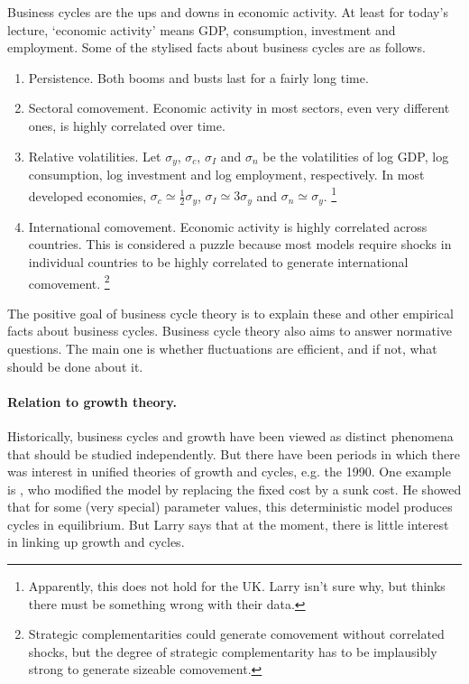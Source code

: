 \documentclass[11pt,letterpaper,reqno,oneside]{article}
\begin{document}
Business cycles are the ups and downs in economic activity. At least for today's lecture, `economic activity' means GDP, consumption, investment and employment. Some of the stylised facts about business cycles are as follows.
%
\begin{enumerate}
	
	\item Persistence. Both booms and busts last for a fairly long time.

	\item Sectoral comovement. Economic activity in most sectors, even very different ones, is highly correlated over time.

	\item Relative volatilities. Let $\sigma_y$, $\sigma_c$, $\sigma_I$ and $\sigma_n$ be the volatilities of log GDP, log consumption, log investment and log employment, respectively. In most developed economies, $\sigma_c \simeq \tfrac{1}{2} \sigma_y$, $\sigma_I \simeq 3 \sigma_y$ and $\sigma_n \simeq \sigma_y$.%
		\footnote{Apparently, this does not hold for the UK. Larry isn't sure why, but thinks there must be something wrong with their data.}

	\item International comovement. Economic activity is highly correlated across countries. This is considered a puzzle because most models require shocks in individual countries to be highly correlated to generate international comovement.%
		\footnote{Strategic complementarities could generate comovement without correlated shocks, but the degree of strategic complementarity has to be implausibly strong to generate sizeable comovement.}
	
\end{enumerate}
%
The positive goal of business cycle theory is to explain these and other empirical facts about business cycles. Business cycle theory also aims to answer normative questions. The main one is whether fluctuations are efficient, and if not, what should be done about it.


\paragraph{Relation to growth theory.} Historically, business cycles and growth have been viewed as distinct phenomena that should be studied independently. But there have been periods in which there was interest in unified theories of growth and cycles, e.g. the 1990. One example is \textcite{Matsuyama1999}, who modified the \textcite{Romer1987} model by replacing the fixed cost by a sunk cost. He showed that for some (very special) parameter values, this deterministic model produces cycles in equilibrium. But Larry says that at the moment, there is little interest in linking up growth and cycles.
\end{document}
